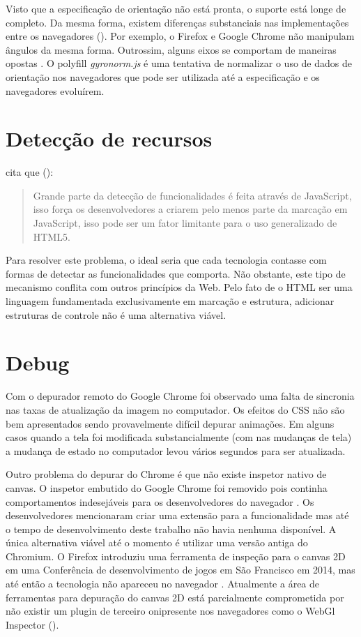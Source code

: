 Visto que a especificação de orientação não está pronta,
o suporte está longe de completo. Da mesma forma, existem
diferenças substanciais nas implementações entre os navegadores
(). Por exemplo, o Firefox e Google
Chrome não manipulam ângulos da mesma forma. Outrossim, alguns
eixos se comportam de maneiras opostas \autocite{mdnOrientation}. O
polyfill \textit{gyronorm.js} é uma tentativa de normalizar o uso de
dados de orientação nos navegadores que pode ser utilizada até a
especificação e os navegadores evoluírem.

\section{Detecção de recursos}

\citet{diveIntohtml} cita que ():
\begin{quote}
Grande parte da detecção de funcionalidades é feita através de
JavaScript, isso força os desenvolvedores a criarem pelo menos parte da
marcação em JavaScript, isso pode ser um fator limitante para o uso
generalizado de HTML5.
\end{quote}

Para resolver este problema, o ideal seria que cada tecnologia contasse
com formas de detectar as funcionalidades que comporta. Não obstante,
este tipo de mecanismo conflita com outros princípios da Web. Pelo
fato de o HTML ser uma linguagem fundamentada exclusivamente em marcação
e estrutura, adicionar estruturas de controle não é uma alternativa
viável.

\section{Debug}

Com o depurador remoto do Google Chrome foi observado uma falta de
sincronia nas taxas de atualização da imagem no computador. Os
efeitos do CSS não são bem apresentados sendo provavelmente difícil
depurar animações. Em alguns casos quando a tela foi modificada
substancialmente (com nas mudanças de tela) a mudança de estado no
computador levou vários segundos para ser atualizada.

Outro problema do depurar do Chrome é que não existe inspetor
nativo de canvas. O inspetor embutido do Google Chrome foi
removido pois continha comportamentos indesejáveis para os
desenvolvedores do navegador \autocite{canvasinspector}. Os
desenvolvedores mencionaram criar uma extensão para a funcionalidade
mas até o tempo de desenvolvimento deste trabalho não havia
nenhuma disponível. A única alternativa viável até o momento é
utilizar uma versão antiga do Chromium. O Firefox introduziu uma
ferramenta de inspeção para o canvas 2D em uma Conferência de
desenvolvimento de jogos em São Francisco em 2014, mas até então a
tecnologia não apareceu no navegador \autocite{firefoxCanvasDebug}.
Atualmente a área de ferramentas para depuração do canvas
2D está parcialmente comprometida por não existir um plugin
de terceiro onipresente nos navegadores como o WebGl Inspector
().

